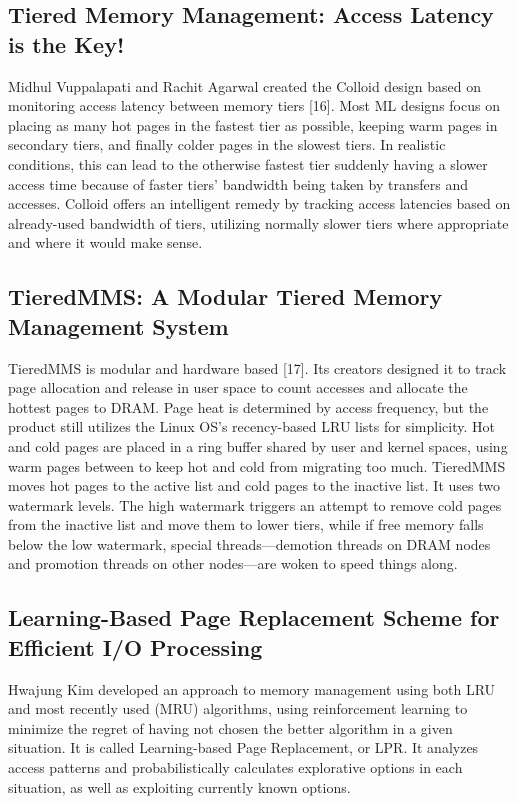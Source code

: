 \documentclass[conference]{IEEEtran}
\begin{document}
\subsection{Tiered Memory Management: Access Latency is the Key!}
Midhul Vuppalapati and Rachit Agarwal created the Colloid design based on monitoring access latency between memory tiers [16].  Most ML designs focus on placing as many hot pages in the fastest tier as possible, keeping warm pages in secondary tiers, and finally colder pages in the slowest tiers.  In realistic conditions, this can lead to the otherwise fastest tier suddenly having a slower access time because of faster tiers’ bandwidth being taken by transfers and accesses.  Colloid offers an intelligent remedy by tracking access latencies based on already-used bandwidth of tiers, utilizing normally slower tiers where appropriate and where it would make sense. 

\subsection{TieredMMS: A Modular Tiered Memory Management System}
TieredMMS is modular and hardware based [17].  Its creators designed it to track page allocation and release in user space to count accesses and allocate the hottest pages to DRAM.  Page heat is determined by access frequency, but the product still utilizes the Linux OS’s recency-based LRU lists for simplicity.  Hot and cold pages are placed in a ring buffer shared by user and kernel spaces, using warm pages between to keep hot and cold from migrating too much.  TieredMMS moves hot pages to the active list and cold pages to the inactive list.  It uses two watermark levels.  The high watermark triggers an attempt to remove cold pages from the inactive list and move them to lower tiers, while if free memory falls below the low watermark, special threads—demotion threads on DRAM nodes and promotion threads on other nodes—are woken to speed things along. 

\subsection{Learning-Based Page Replacement Scheme for Efficient I/O Processing}
Hwajung Kim developed an approach to memory management using both LRU and most recently used (MRU) algorithms, using reinforcement learning to minimize the regret of having not chosen the better algorithm in a given situation.  It is called Learning-based Page Replacement, or LPR.  It analyzes access patterns and probabilistically calculates explorative options in each situation, as well as exploiting currently known options.
\end{document}
